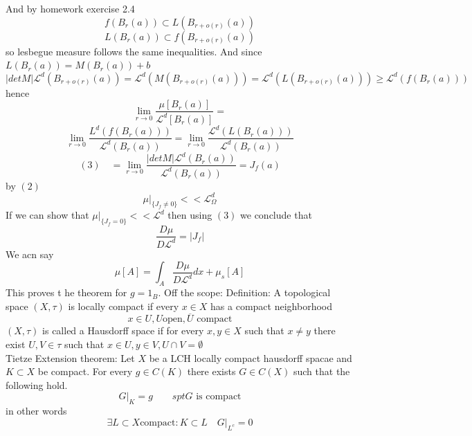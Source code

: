 \documentclass[11pt]{article}
\begin{document}
And by homework exercise 2.4
\[
    f(B_r(a)) \subset L(B_{r + o(r)}(a)) 
\] 
\[
    L(B_r(a)) \subset f(B_{r + o(r)}(a))
\] 
so lesbegue measure follows the same inequalities.
And since $L(B_r(a)) = M(B_r(a)) + b$ 
\[
    |det M| \mathcal{L}^{d}(B_{r + o(r)}(a)) =\mathcal{L}^{d}(M(B_{r + o(r)}(a))) = \mathcal{L}^{d}(L(B_{r + o(r)}(a))) \ge \mathcal{L}^{d}(f(B_r(a)))
\] 
hence
\[
    \lim_{r\to 0} \frac{\mu[B_r(a)]}{ \mathcal{L}^{d}[B_r(a)]} = 
\] 
\[
\lim_{r\to 0} \frac{L^{d}(f(B_r(a)))}{ \mathcal{L}^{d}(B_r(a))} = \lim_{r\to 0} \frac{\mathcal{L}^{d}( L (B_r(a)))}{ \mathcal{L}^{d}(B_r(a))}
\] 
\[
    (3) \quad    = \lim_{r\to 0} \frac{|det M| \mathcal{L}^{d}(B_r(a))}{ \mathcal{L}^{d}(B_r(a))} = J_f(a)
\] 
by $(2)$
 \[
     \mu|_{\{J_f \ne 0\}} << \mathcal{L}^{d}_\Omega
\] 
If we can show that $\mu|_{\{J_f = 0\}} << \mathcal{L}^{d}$ then using $(3)$ we conclude that
\[
\frac{D \mu }{ D \mathcal{L}^{d}} = |J_f|
\] 
We acn say
\[
    \mu[A] = \int_{A}^{} \frac{D \mu}{ D \mathcal{L}^{d}} dx + \mu_s [A]
\] 
This proves t he theorem for $g = 1_B$.
Off the scope: 
Definition: A topological space  $(X, \tau)$ is locally compact if every $x \in X$ has a compact neighborhood
 \[
     x \in U, U \text{open},  \overline{ U} \text{ compact}
\] 
$(X , \tau)$ is called a Hausdorff space if for every  $x,y \in X$ such that  $x \ne y$ there exist  $U,V \in \tau$ such that $x \in U, y \in V, U \cap V = \emptyset$\\
Tietze Extension theorem:
Let  $X$ be a LCH locally compact hausdorff spacae and  $K \subset X$ be compact. For every $g \in C(K)$ there exists  $G \in C(X)$ such that the following hold.
 \[
     G|_K = g \qquad spt G \text{ is compact}
\] 
in other words
\[
    \exists L \subset X \text{compact} : K \subset L \quad G|_{L^{c}} = 0
\] 
\end{document}
